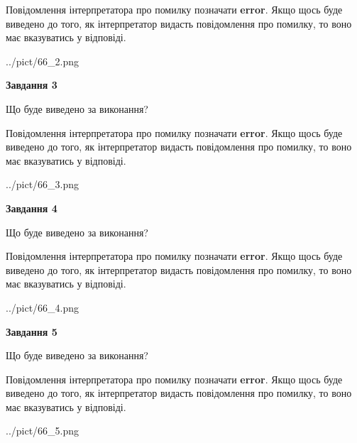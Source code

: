 \documentclass[12pt, ukrainian]{article}
\begin{document}
{\begin {large}
Повідомлення інтерпретатора про помилку позначати \textbf{error}.
Якщо щось буде виведено до того, як інтерпретатор видасть повідомлення про помилку, 
то воно має вказуватись у відповіді. \par


\begin{center}
	{../pict/66_2.png}
\end{center}
\newpage

{\begin {center}\textbf{Завдання 3}\end {center}}\par
Що буде виведено за виконання?

Повідомлення інтерпретатора про помилку позначати \textbf{error}.
Якщо щось буде виведено до того, як інтерпретатор видасть повідомлення про помилку, 
то воно має вказуватись у відповіді. \par


\begin{center}
	{../pict/66_3.png}
\end{center}
\newpage

{\begin {center}\textbf{Завдання 4}\end {center}}\par
Що буде виведено за виконання?

Повідомлення інтерпретатора про помилку позначати \textbf{error}.
Якщо щось буде виведено до того, як інтерпретатор видасть повідомлення про помилку, 
то воно має вказуватись у відповіді. \par


\begin{center}
	{../pict/66_4.png}
\end{center}
\newpage

{\begin {center}\textbf{Завдання 5}\end {center}}\par
Що буде виведено за виконання?

Повідомлення інтерпретатора про помилку позначати \textbf{error}.
Якщо щось буде виведено до того, як інтерпретатор видасть повідомлення про помилку, 
то воно має вказуватись у відповіді. \par


\begin{center}
	{../pict/66_5.png}
\end{center}
\newpage


\end{large}}
\end{document}
